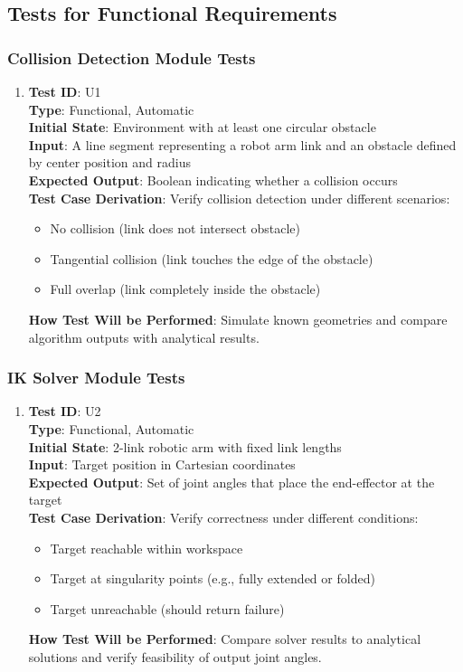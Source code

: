 \documentclass[12pt, titlepage]{article}
\begin{document}
\subsection{Tests for Functional Requirements}

\subsubsection{Collision Detection Module Tests}

\begin{enumerate}
\item \textbf{Test ID}: U1 \\ 
\textbf{Type}: Functional, Automatic \\ 
\textbf{Initial State}: Environment with at least one circular obstacle \\ 
\textbf{Input}: A line segment representing a robot arm link and an obstacle defined by center position and radius \\ 
\textbf{Expected Output}: Boolean indicating whether a collision occurs \\ 
\textbf{Test Case Derivation}: Verify collision detection under different scenarios:
\begin{itemize}
    \item No collision (link does not intersect obstacle)
    \item Tangential collision (link touches the edge of the obstacle)
    \item Full overlap (link completely inside the obstacle)
\end{itemize}
\textbf{How Test Will be Performed}: Simulate known geometries and compare algorithm outputs with analytical results.
\end{enumerate}

\subsubsection{IK Solver Module Tests}

\begin{enumerate}
\item \textbf{Test ID}: U2 \\ 
\textbf{Type}: Functional, Automatic \\ 
\textbf{Initial State}: 2-link robotic arm with fixed link lengths \\ 
\textbf{Input}: Target position in Cartesian coordinates \\ 
\textbf{Expected Output}: Set of joint angles that place the end-effector at the target \\ 
\textbf{Test Case Derivation}: Verify correctness under different conditions:
\begin{itemize}
    \item Target reachable within workspace
    \item Target at singularity points (e.g., fully extended or folded)
    \item Target unreachable (should return failure)
\end{itemize}
\textbf{How Test Will be Performed}: Compare solver results to analytical solutions and verify feasibility of output joint angles.
\end{enumerate}
\end{document}
